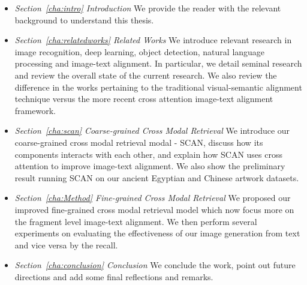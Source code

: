 \begin{itemize}
    
    \item \textit{Section~\ref{cha:intro} Introduction}\newline
    We provide the reader with the relevant background to understand this thesis.

    \item \textit{Section~\ref{cha:relatedworks} Related Works}\newline
    We introduce relevant research in image recognition, deep learning, object detection, natural language processing and image-text alignment. In particular, we detail seminal research and review the overall state of the current research. We also review the difference in the works pertaining to the traditional visual-semantic alignment technique versus the more recent cross attention image-text alignment framework.
    
    \item \textit{Section~\ref{cha:scan} Coarse-grained Cross Modal Retrieval}\newline
    We introduce our coarse-grained cross modal retrieval modal - SCAN, discuss how its components interacts with each other, and explain how SCAN uses cross attention to improve image-text alignment. We also show the preliminary result running SCAN on our ancient Egyptian and Chinese artwork datasets.
    
    \item \textit{Section~\ref{cha:Method} Fine-grained Cross Modal Retrieval}\newline
    We proposed our improved fine-grained cross modal retrieval model which now focus more on the fragment level image-text alignment. We then perform several experiments on evaluating the effectiveness of our image generation from text and vice versa by the recall.
    
    \item \textit{Section~\ref{cha:conclusion} Conclusion}\newline
    We conclude the work, point out future directions and add some final reflections and remarks.
\end{itemize}
